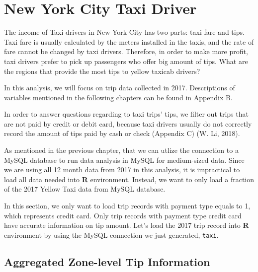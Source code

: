 \documentclass[12pt,twoside]{reedthesis}
\newenvironment{Shaded}{\begin{snugshade}}{\end{snugshade}}
\newcommand{\KeywordTok}[1]{\textcolor[rgb]{0.13,0.29,0.53}{\textbf{#1}}}
\newcommand{\DataTypeTok}[1]{\textcolor[rgb]{0.13,0.29,0.53}{#1}}
\newcommand{\DecValTok}[1]{\textcolor[rgb]{0.00,0.00,0.81}{#1}}
\newcommand{\StringTok}[1]{\textcolor[rgb]{0.31,0.60,0.02}{#1}}
\newcommand{\OtherTok}[1]{\textcolor[rgb]{0.56,0.35,0.01}{#1}}
\newcommand{\OperatorTok}[1]{\textcolor[rgb]{0.81,0.36,0.00}{\textbf{#1}}}
\newcommand{\NormalTok}[1]{#1}
\theoremstyle{definition}
\theoremstyle{definition}
\theoremstyle{definition}
\theoremstyle{remark}
\begin{document}
\chapter{New York City Taxi Driver}\label{chapter3}

The income of Taxi drivers in New York City has two parts: taxi fare and
tips. Taxi fare is usually calculated by the meters installed in the
taxis, and the rate of fare cannot be changed by taxi drivers.
Therefore, in order to make more profit, taxi drivers prefer to pick up
passengers who offer big amount of tips. What are the regions that
provide the most tips to yellow taxicab drivers?

In this analysis, we will focus on trip data collected in 2017.
Descriptions of variables mentioned in the following chapters can be
found in Appendix B.

In order to answer questions regarding to taxi trips' tips, we filter
out trips that are not paid by credit or debit card, because taxi
drivers usually do not correctly record the amount of tips paid by cash
or check (Appendix C) (W. Li, 2018).

As mentioned in the previous chapter, that we can utlize the connection
to a MySQL database to run data analysis in MySQL for medium-sized data.
Since we are using all 12 month data from 2017 in this analysis, it is
impractical to load all data needed into \textbf{R} environment.
Instead, we want to only load a fraction of the 2017 Yellow Taxi data
from MySQL database.

In this section, we only want to load trip records with payment type
equals to 1, which represents credit card. Only trip records with
payment type credit card have accurate information on tip amount. Let's
load the 2017 trip record into \textbf{R} environment by using the MySQL
connection we just generated, \texttt{taxi}.
\begin{Shaded}
\end{Shaded}
\section{Aggregated Zone-level Tip
Information}\label{aggregated-zone-level-tip-information}
\end{document}
